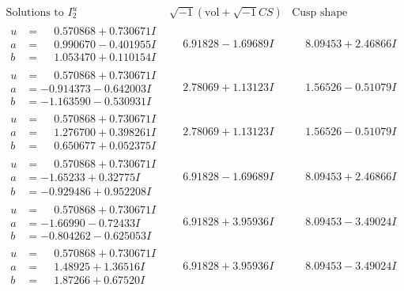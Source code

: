 \documentclass[1p]{elsarticle_modified}
\theoremstyle{definition}
\newcommand{\I}{\sqrt{-1}}
\begin{document}
$$\begin{array}{c|c|c}  
\text{Solutions to }I^u_{2}& \I (\text{vol} + \sqrt{-1}CS) & \text{Cusp shape}\\
 \hline 
\begin{aligned}
u &= \phantom{-}0.570868 + 0.730671 I \\
a &= \phantom{-}0.990670 - 0.401955 I \\
b &= \phantom{-}1.053470 + 0.110154 I\end{aligned}
 & \phantom{-}6.91828 - 1.69689 I & \phantom{-}8.09453 + 2.46866 I \\ \hline\begin{aligned}
u &= \phantom{-}0.570868 + 0.730671 I \\
a &= -0.914373 - 0.642003 I \\
b &= -1.163590 - 0.530931 I\end{aligned}
 & \phantom{-}2.78069 + 1.13123 I & \phantom{-}1.56526 - 0.51079 I \\ \hline\begin{aligned}
u &= \phantom{-}0.570868 + 0.730671 I \\
a &= \phantom{-}1.276700 + 0.398261 I \\
b &= \phantom{-}0.650677 + 0.052375 I\end{aligned}
 & \phantom{-}2.78069 + 1.13123 I & \phantom{-}1.56526 - 0.51079 I \\ \hline\begin{aligned}
u &= \phantom{-}0.570868 + 0.730671 I \\
a &= -1.65233 + 0.32775 I \\
b &= -0.929486 + 0.952208 I\end{aligned}
 & \phantom{-}6.91828 - 1.69689 I & \phantom{-}8.09453 + 2.46866 I \\ \hline\begin{aligned}
u &= \phantom{-}0.570868 + 0.730671 I \\
a &= -1.66990 - 0.72433 I \\
b &= -0.804262 - 0.625053 I\end{aligned}
 & \phantom{-}6.91828 + 3.95936 I & \phantom{-}8.09453 - 3.49024 I \\ \hline\begin{aligned}
u &= \phantom{-}0.570868 + 0.730671 I \\
a &= \phantom{-}1.48925 + 1.36516 I \\
b &= \phantom{-}1.87266 + 0.67520 I\end{aligned}
 & \phantom{-}6.91828 + 3.95936 I & \phantom{-}8.09453 - 3.49024 I \\ \hline\begin{aligned}

\end{aligned}
\end{array}$$
\end{document}
